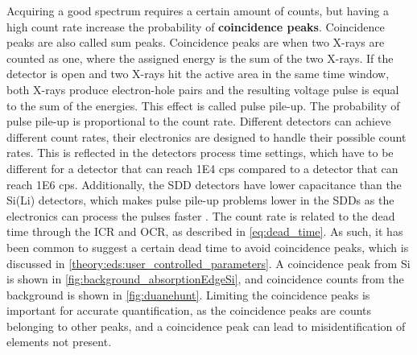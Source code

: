 Acquiring a good spectrum requires a certain amount of counts, but having a high count rate increase the probability of \textbf{coincidence peaks}.
Coincidence peaks are also called sum peaks.
Coincidence peaks are when two X-rays are counted as one, where the assigned energy is the sum of the two X-rays.
If the detector is open and two X-rays hit the active area in the same time window, both X-rays produce electron-hole pairs and the resulting voltage pulse is equal to the sum of the energies.
This effect is called pulse pile-up.
The probability of pulse pile-up is proportional to the count rate.
Different detectors can achieve different count rates, their electronics are designed to handle their possible count rates.
This is reflected in the detectors process time settings, which have to be different for a detector that can reach 1E4 cps compared to a detector that can reach 1E6 cps.
Additionally, the SDD detectors have lower capacitance than the Si(Li) detectors, which makes pulse pile-up problems lower in the SDDs as the electronics can process the pulses faster \cite{astm_e1508_eds_quantification}.
The count rate is related to the dead time through the ICR and OCR, as described in \cref{eq:dead_time}.
As such, it has been common to suggest a certain dead time to avoid coincidence peaks, which is discussed in \cref{theory:eds:user_controlled_parameters}.
A coincidence peak from Si is shown in \cref{fig:background_absorptionEdgeSi}, and coincidence counts from the background is shown in \cref{fig:duanehunt}.
Limiting the coincidence peaks is important for accurate quantification, as the coincidence peaks are counts belonging to other peaks, and a coincidence peak can lead to misidentification of elements not present.






